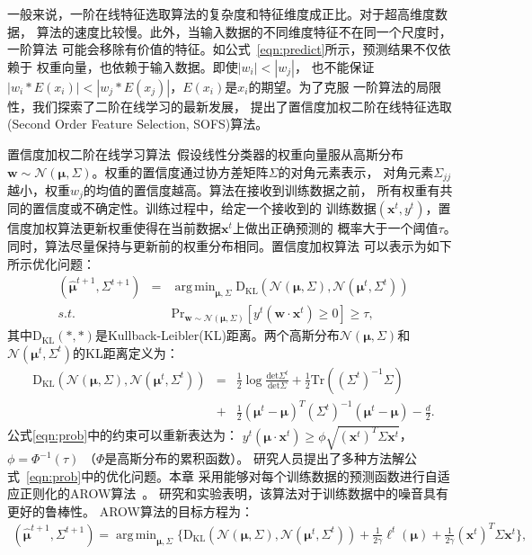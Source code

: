 \documentclass[doctor]{ustcthesis}
\def \w  {\mathbf{w}}
\def \x {\mathbf{x}}
\DeclareMathOperator*{\argmin}{arg\,min}
\def \Mu {\pmb{\mu}}
\def \Nn {\mathcal{N}}
\def \Pr   {\mathrm{Pr}}
\def \DKL   {\mathrm{D_{KL}}}
\begin{document}
一般来说，一阶在线特征选取算法的复杂度和特征维度成正比。对于超高维度数据，
算法的速度比较慢。此外，当输入数据的不同维度特征不在同一个尺度时，一阶算法
可能会移除有价值的特征。如公式~\eqref{eqn:predict}所示，预测结果不仅依赖于
权重向量，也依赖于输入数据。即使$|w_i|<|w_j|$，
也不能保证$|w_i * E(x_i)| < |w_j * E(x_j)|$，$E(x_i)$是$x_i$的期望。为了克服
一阶算法的局限性，我们探索了二阶在线学习的最新发展，
提出了置信度加权二阶在线特征选取(Second Order Feature Selection, SOFS)算法。

置信度加权二阶在线学习算法~\cite{dredze2008confidence}假设线性分类器的权重向量服从高斯分布
$\w\sim \Nn(\Mu, \Sigma)$。权重的置信度通过协方差矩阵$\Sigma$的对角元素表示，
对角元素$\Sigma_{jj}$越小，权重$w_j$的均值的置信度越高。算法在接收到训练数据之前，
所有权重有共同的置信度或不确定性。训练过程中，给定一个接收到的
训练数据$(\x^t,y^t)$，置信度加权算法更新权重使得在当前数据$\x^t$上做出正确预测的
概率大于一个阈值$\tau$。同时，算法尽量保持与更新前的权重分布相同。置信度加权算法
可以表示为如下所示优化问题：
\begin{eqnarray} \label{eqn:prob}
    (\hat{\Mu}^{t+1},\Sigma^{t+1}) &=&
    \argmin_{\Mu,\Sigma}{\DKL(\Nn(\Mu,\Sigma), \Nn(\Mu^t,\Sigma^t))}
    \nonumber \\
    s.t. &&\Pr_{\w\sim\Nn(\Mu,\Sigma)}[y^t(\w\cdot \x^t) \geq 0]  \geq \tau,
\end{eqnarray}
其中$\DKL(*,*)$是Kullback-Leibler(KL)距离。两个高斯分布$\Nn(\Mu,\Sigma)$和
$\Nn(\Mu^t,\Sigma^t)$的KL距离定义为：
\begin{eqnarray}
    \DKL(\Nn(\Mu,\Sigma), \Nn(\Mu^t,\Sigma^t)) &=&
    \frac{1}{2}\log{\frac{\text{det}\Sigma^t}{\text{det}\Sigma}}
    + \frac{1}{2}\text{Tr}((\Sigma^t)^{-1}\Sigma) \nonumber \\
    &+& \frac{1}{2}(\Mu^t - \Mu)^T(\Sigma^t)^{-1}(\Mu^t - \Mu) - \frac{d}{2}.
\end{eqnarray}
公式\eqref{eqn:prob}中的约束可以重新表达为：
$y^t(\Mu\cdot \x^t)  \geq  \phi\sqrt{(\x^t)^T\Sigma\x^t}$，
$\phi = \Phi^{-1}(\tau)$ （$\Phi$是高斯分布的累积函数）。
研究人员提出了多种方法解公式~\eqref{eqn:prob}中的优化问题。本章
采用能够对每个训练数据的预测函数进行自适应正则化的AROW算法~\cite{crammer2009adaptive}。
研究和实验表明，该算法对于训练数据中的噪音具有更好的鲁棒性。
AROW算法的目标方程为：
\vspace{-0.5em}
\begin{eqnarray}
    (\hat{\Mu}^{t+1},\Sigma^{t+1}) =
    \argmin_{\Mu,\Sigma}\big\{\DKL(\Nn(\Mu,\Sigma),
        \Nn(\Mu^t,\Sigma^t))
    + \frac{1}{2\gamma}\ell^t(\Mu) + \frac{1}{2\gamma}(\x^t)^T\Sigma\x^t\big\},
    \label{eqn:arow_obj}
\end{eqnarray}
\end{document}
